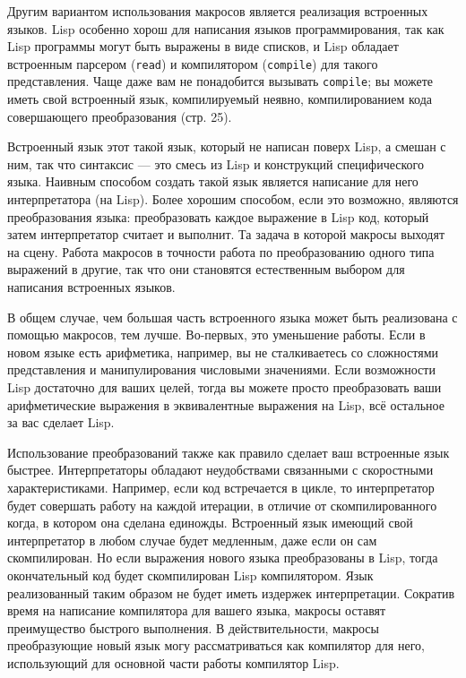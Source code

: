 \documentclass[12pt, a4paper]{article} %
\begin{document}
Другим вариантом использования макросов является реализация встроенных языков. Lisp особенно хорош для написания языков программирования, так как Lisp программы могут быть выражены в виде списков, и Lisp обладает встроенным парсером (\texttt{read}) и компилятором (\texttt{compile}) для такого представления. Чаще даже вам не понадобится вызывать \texttt{compile}; вы можете иметь свой встроенный язык, компилируемый неявно, компилированием кода совершающего преобразования (стр. 25).

Встроенный язык этот такой язык, который не написан поверх Lisp, а смешан с ним, так что синтаксис --- это смесь из Lisp и конструкций специфического языка. Наивным способом создать такой язык является написание для него интерпретатора (на Lisp). Более хорошим способом, если это возможно, являются преобразования языка: преобразовать каждое выражение в Lisp код, который затем интерпретатор считает и выполнит. Та задача в которой макросы выходят на сцену. Работа макросов в точности работа по преобразованию одного типа выражений в другие, так что они становятся естественным выбором для написания встроенных языков. 

В общем случае, чем большая часть встроенного языка может быть реализована с помощью макросов, тем лучше. Во-первых, это уменьшение работы. Если в новом языке есть арифметика, например, вы не сталкиваетесь со сложностями представления и манипулирования числовыми значениями. Если возможности Lisp достаточно для ваших целей, тогда вы можете просто преобразовать ваши арифметические выражения в эквивалентные выражения на Lisp, всё остальное за вас сделает Lisp.

Использование преобразований также как правило сделает ваш встроенные язык быстрее. Интерпретаторы обладают неудобствами связанными с скоростными характеристиками. Например, если код встречается в цикле, то интерпретатор будет совершать работу на каждой итерации, в отличие от скомпилированного когда, в котором она сделана единожды. Встроенный язык имеющий свой интерпретатор в любом случае будет медленным, даже если он сам скомпилирован. Но если выражения нового языка преобразованы в Lisp, тогда окончательный код будет скомпилирован Lisp компилятором. Язык реализованный таким образом не будет иметь издержек интерпретации. Сократив время на написание компилятора для вашего языка, макросы оставят преимущество быстрого выполнения. В действительности, макросы преобразующие новый язык могу рассматриваться как компилятор для него, использующий для основной части работы компилятор Lisp.
\end{document}
